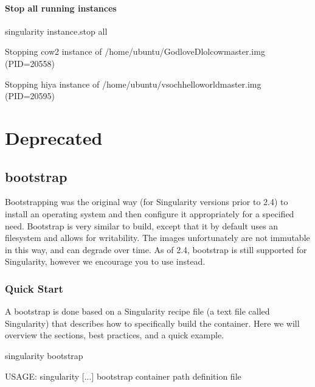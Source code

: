 \documentclass[letterpaper,10pt,english]{sphinxmanual}
\begin{document}
\paragraph{Stop all running instances}
\label{\detokenize{appendix:stop-all-running-instances}}
%
\begin{sphinxVerbatim}[commandchars=\\\{\}]
\PYGZdl{} singularity instance.stop \PYGZhy{}\PYGZhy{}all

Stopping cow2 instance of /home/ubuntu/GodloveD\PYGZhy{}lolcow\PYGZhy{}master.img (PID=20558)

Stopping hiya instance of /home/ubuntu/vsoch\PYGZhy{}hello\PYGZhy{}world\PYGZhy{}master.img (PID=20595)
\end{sphinxVerbatim}


\section{Deprecated}
\label{\detokenize{appendix:deprecated}}

\subsection{bootstrap}
\label{\detokenize{appendix:bootstrap}}\label{\detokenize{appendix:id50}}\label{\detokenize{appendix:sec-bootstrap}}
Bootstrapping was the original way (for Singularity versions prior to
2.4) to install an operating system and then configure it appropriately
for a specified need. Bootstrap is very similar to build, except that it
by default uses an  filesystem and allows for writability. The
images unfortunately are not immutable in this way, and can degrade over
time. As of 2.4, bootstrap is still supported for Singularity, however
we encourage you to use {\hyperref[\detokenize{build_a_container:build-a-container}]{}} instead.


\subsubsection{Quick Start}
\label{\detokenize{appendix:quick-start}}
A bootstrap is done based on a Singularity recipe file (a text file
called Singularity) that describes how to specifically build the
container. Here we will overview the sections, best practices, and a
quick example.

%
\begin{sphinxVerbatim}[commandchars=\\\{\}]
\PYGZdl{} singularity bootstrap

USAGE: singularity [...] bootstrap \PYGZlt{}container path\PYGZgt{} \PYGZlt{}definition file\PYGZgt{}
\end{sphinxVerbatim}
\end{document}
